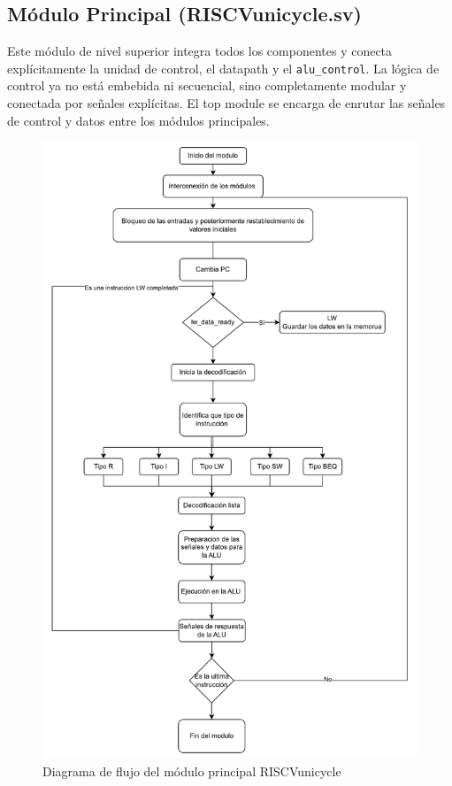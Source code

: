 \documentclass[conference]{IEEEtran}
\begin{document}
\subsection{Módulo Principal (RISCVunicycle.sv)}
Este módulo de nivel superior integra todos los componentes y conecta explícitamente la unidad de control, el datapath y el \texttt{alu\_control}. La lógica de control ya no está embebida ni secuencial, sino completamente modular y conectada por señales explícitas. El top module se encarga de enrutar las señales de control y datos entre los módulos principales.

\begin{figure}[h!]
    \centering
    \includegraphics[width=0.95\linewidth]{Diagrama de flujo del modulo RISCVunicycle.png}
    \caption{Diagrama de flujo del módulo principal RISCVunicycle}
    \label{fig:diagrama-flujo-riscvunicycle}
\end{figure}
\end{document}
